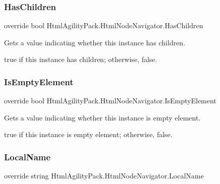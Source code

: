 \subsubsection{\texorpdfstring{Has\+Children}{HasChildren}}
{\footnotesize\ttfamily override bool Html\+Agility\+Pack.\+Html\+Node\+Navigator.\+Has\+Children\hspace{0.3cm}{\ttfamily [get]}}



Gets a value indicating whether this instance has children. 

{\ttfamily true} if this instance has children; otherwise, {\ttfamily false}.\mbox{\label{class_html_agility_pack_1_1_html_node_navigator_a76d921c935375e6b46286c8f064e79ae}} 
\subsubsection{\texorpdfstring{Is\+Empty\+Element}{IsEmptyElement}}
{\footnotesize\ttfamily override bool Html\+Agility\+Pack.\+Html\+Node\+Navigator.\+Is\+Empty\+Element\hspace{0.3cm}{\ttfamily [get]}}



Gets a value indicating whether this instance is empty element. 

{\ttfamily true} if this instance is empty element; otherwise, {\ttfamily false}.\mbox{\label{class_html_agility_pack_1_1_html_node_navigator_acd22c35f48e8c0bdbe265fd1aee95e62}} 
\subsubsection{\texorpdfstring{Local\+Name}{LocalName}}
{\footnotesize\ttfamily override string Html\+Agility\+Pack.\+Html\+Node\+Navigator.\+Local\+Name\hspace{0.3cm}{\ttfamily [get]}}



